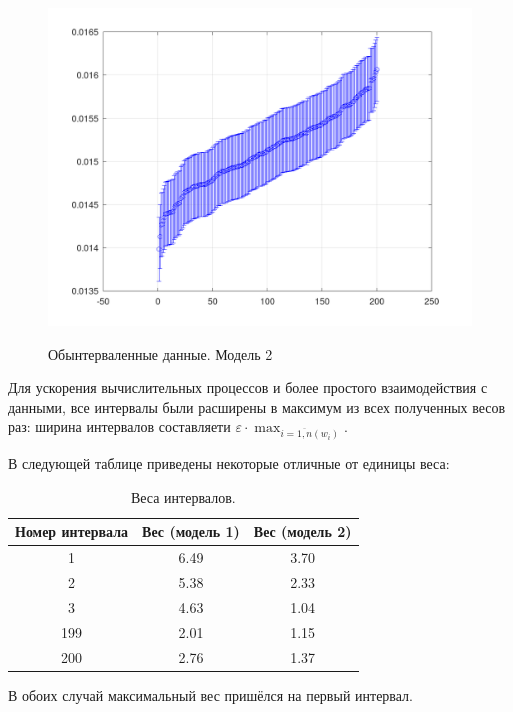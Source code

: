 \begin{figure}[H]
	\begin{center}
		\includegraphics[scale=0.29]{interval_problem_2}
		\label{pic:model2}
		\caption{Обынтерваленные данные. Модель 2}
	\end{center}
\end{figure}

Для ускорения вычислительных процессов и более простого взаимодействия с данными, все интервалы были расширены в максимум из всех полученных весов раз: ширина интервалов составляети $\varepsilon \cdot \max_{i=\overline{1,n}(w_i)}$.

В следующей таблице приведены некоторые отличные от единицы веса:

\begin{table}[H]
	\begin{center}
		\begin{tabular}{|c|c|c|}
			\hline
			Номер интервала & Вес (модель 1) & Вес (модель 2) \\
			\hline
			1 & 6.49 & 3.70 \\
			\hline
			2 & 5.38 & 2.33 \\
			\hline
			3 & 4.63 & 1.04 \\
			\hline
			199 & 2.01 & 1.15  \\
			\hline
			200 & 2.76 & 1.37 \\
			\hline
		\end{tabular}
		\caption{Веса интервалов.}
	\end{center}
\end{table}

В обоих случай максимальный вес пришёлся на первый интервал.

